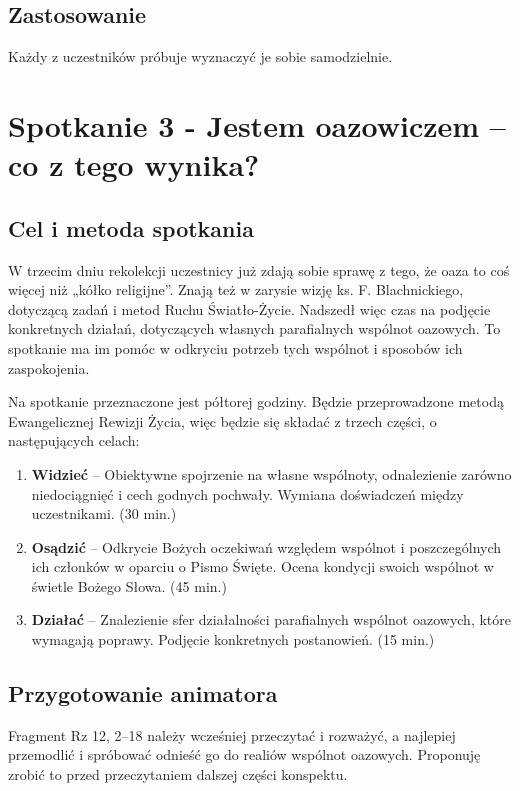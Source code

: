 \documentclass[a5paper,10pt,polish]{book}
\begin{document}
\section{Zastosowanie}
\label{babice2006-jesien-gliwice/spotkanie2:zastosowanie}
Każdy z uczestników próbuje wyznaczyć je sobie samodzielnie.


\chapter{Spotkanie 3 - Jestem oazowiczem – co z tego wynika?}
\label{babice2006-jesien-gliwice/spotkanie3::doc}\label{babice2006-jesien-gliwice/spotkanie3:spotkanie-3-jestem-oazowiczem-co-z-tego-wynika}

\section{Cel i metoda spotkania}
\label{babice2006-jesien-gliwice/spotkanie3:cel-i-metoda-spotkania}
W trzecim dniu rekolekcji  uczestnicy  już zdają sobie sprawę z tego, że oaza  to coś więcej niż „kółko religijne”. Znają też w zarysie wizję ks. F. Blachnickiego, dotyczącą zadań i metod Ruchu Światło-Życie. Nadszedł  więc czas na podjęcie konkretnych działań, dotyczących własnych parafialnych wspólnot oazowych. To spotkanie ma im pomóc w odkryciu potrzeb tych wspólnot i sposobów ich zaspokojenia.

Na spotkanie przeznaczone jest półtorej godziny. Będzie przeprowadzone metodą Ewangelicznej Rewizji Życia, więc będzie się składać z trzech części, o następujących celach:
\begin{enumerate}
\item {} 
\textbf{Widzieć} – Obiektywne spojrzenie na własne wspólnoty, odnalezienie zarówno niedociągnięć i cech godnych pochwały. Wymiana doświadczeń między uczestnikami. (30 min.)

\item {} 
\textbf{Osądzić} – Odkrycie Bożych oczekiwań względem wspólnot i poszczególnych ich członków w oparciu o Pismo Święte. Ocena kondycji swoich wspólnot w świetle Bożego Słowa. (45 min.)

\item {} 
\textbf{Działać} – Znalezienie sfer działalności parafialnych wspólnot oazowych, które wymagają poprawy. Podjęcie konkretnych postanowień. (15 min.)

\end{enumerate}


\section{Przygotowanie animatora}
\label{babice2006-jesien-gliwice/spotkanie3:przygotowanie-animatora}
Fragment Rz 12, 2–18 należy wcześniej przeczytać i rozważyć, a najlepiej przemodlić i spróbować odnieść go do realiów wspólnot oazowych. Proponuję zrobić to przed przeczytaniem  dalszej części konspektu.
\end{document}
